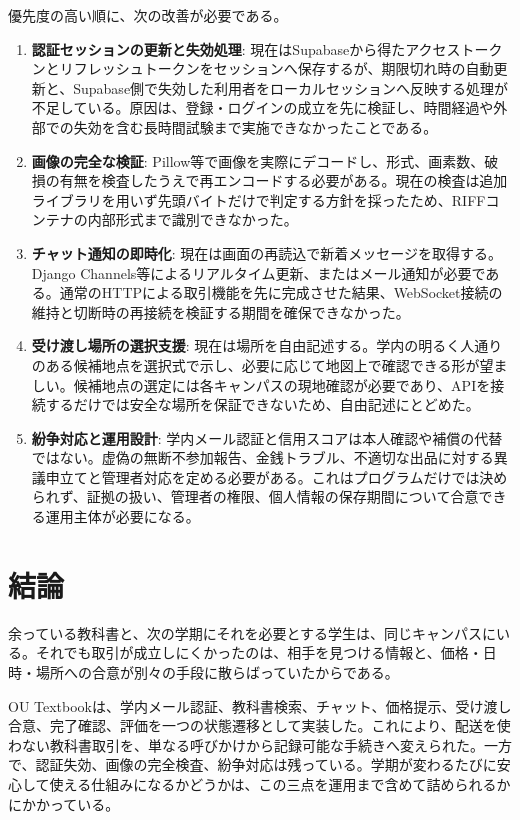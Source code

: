 \documentclass[11pt,a4paper]{jsarticle}
\begin{document}
優先度の高い順に、次の改善が必要である。
\begin{enumerate}
    \item \textbf{認証セッションの更新と失効処理}: 現在はSupabaseから得たアクセストークンとリフレッシュトークンをセッションへ保存するが、期限切れ時の自動更新と、Supabase側で失効した利用者をローカルセッションへ反映する処理が不足している。原因は、登録・ログインの成立を先に検証し、時間経過や外部での失効を含む長時間試験まで実施できなかったことである。
    \item \textbf{画像の完全な検証}: Pillow等で画像を実際にデコードし、形式、画素数、破損の有無を検査したうえで再エンコードする必要がある。現在の検査は追加ライブラリを用いず先頭バイトだけで判定する方針を採ったため、RIFFコンテナの内部形式まで識別できなかった。
    \item \textbf{チャット通知の即時化}: 現在は画面の再読込で新着メッセージを取得する。Django Channels等によるリアルタイム更新、またはメール通知が必要である。通常のHTTPによる取引機能を先に完成させた結果、WebSocket接続の維持と切断時の再接続を検証する期間を確保できなかった。
    \item \textbf{受け渡し場所の選択支援}: 現在は場所を自由記述する。学内の明るく人通りのある候補地点を選択式で示し、必要に応じて地図上で確認できる形が望ましい。候補地点の選定には各キャンパスの現地確認が必要であり、APIを接続するだけでは安全な場所を保証できないため、自由記述にとどめた。
    \item \textbf{紛争対応と運用設計}: 学内メール認証と信用スコアは本人確認や補償の代替ではない。虚偽の無断不参加報告、金銭トラブル、不適切な出品に対する異議申立てと管理者対応を定める必要がある。これはプログラムだけでは決められず、証拠の扱い、管理者の権限、個人情報の保存期間について合意できる運用主体が必要になる。
\end{enumerate}

\section{結論}
余っている教科書と、次の学期にそれを必要とする学生は、同じキャンパスにいる。それでも取引が成立しにくかったのは、相手を見つける情報と、価格・日時・場所への合意が別々の手段に散らばっていたからである。

OU Textbookは、学内メール認証、教科書検索、チャット、価格提示、受け渡し合意、完了確認、評価を一つの状態遷移として実装した。これにより、配送を使わない教科書取引を、単なる呼びかけから記録可能な手続きへ変えられた。一方で、認証失効、画像の完全検査、紛争対応は残っている。学期が変わるたびに安心して使える仕組みになるかどうかは、この三点を運用まで含めて詰められるかにかかっている。
\end{document}
